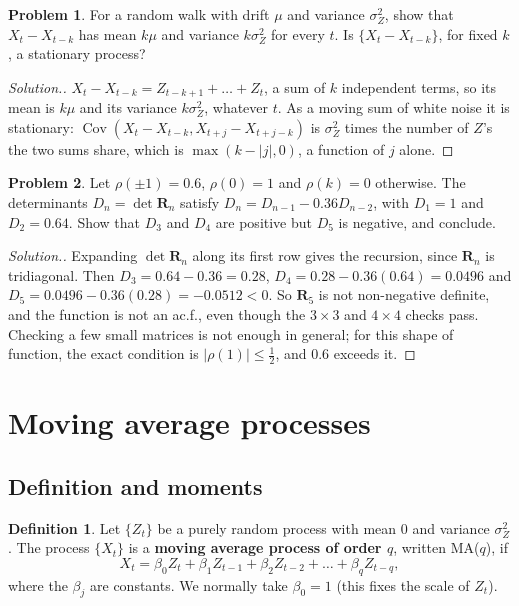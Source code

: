 \documentclass[11pt,a4paper]{article}
\theoremstyle{definition}
\newtheorem{defn}[thm]{Definition}
\newtheorem{problemx}{Problem}[subsection]
\newenvironment{problem}{\begin{problemx}}{\end{problemx}}
\newenvironment{solution}
  {\renewcommand{\qedsymbol}{}\begin{proof}[\textit{Solution}.]}
  {\end{proof}}
\DeclareMathOperator{\Cov}{Cov}
\begin{document}
\begin{problem}\label{prob:ts-rw-increment}
For a random walk with drift $\mu$ and variance $\sigma_Z^2$, show that $X_t - X_{t-k}$ has mean $k\mu$ and variance $k\sigma_Z^2$ for every $t$. Is $\{X_t - X_{t-k}\}$,
for fixed $k$, a stationary process?
\end{problem}

\begin{solution}
$X_t - X_{t-k} = Z_{t-k+1} + \dots + Z_t$, a sum of $k$ independent terms, so its mean is $k\mu$ and its variance $k\sigma_Z^2$, whatever $t$. As a moving sum
of white noise it is stationary: $\Cov(X_t - X_{t-k}, X_{t+j} - X_{t+j-k})$ is $\sigma_Z^2$ times the number of $Z$'s the two sums share, which is $\max(k - |j|, 0)$,
a function of $j$ alone.
\end{solution}

\begin{problem}\label{prob:ts-not-acf}
Let $\rho(\pm1) = 0.6$, $\rho(0) = 1$ and $\rho(k) = 0$ otherwise. The determinants $D_n = \det\mathbf{R}_n$ satisfy $D_n = D_{n-1} - 0.36D_{n-2}$, with $D_1 = 1$ and
$D_2 = 0.64$. Show that $D_3$ and $D_4$ are positive but $D_5$ is negative, and conclude.
\end{problem}

\begin{solution}
Expanding $\det\mathbf{R}_n$ along its first row gives the recursion, since $\mathbf{R}_n$ is tridiagonal. Then
$D_3 = 0.64 - 0.36 = 0.28$, $D_4 = 0.28 - 0.36(0.64) = 0.0496$ and $D_5 = 0.0496 - 0.36(0.28) = -0.0512 < 0$. So $\mathbf{R}_5$ is not non-negative definite, and the
function is not an ac.f., even though the $3 \times 3$ and $4 \times 4$ checks pass. Checking a few small matrices is not enough in
general; for this shape of function, the exact condition is $|\rho(1)| \le \frac12$, and $0.6$ exceeds it.
\end{solution}

\section{Moving average processes}\label{sec:ma}
\subsection{Definition and moments}
\begin{defn}
Let $\{Z_t\}$ be a purely random process with mean $0$ and variance $\sigma_Z^2$. The process $\{X_t\}$ is a \textbf{moving average
process of order $q$}, written MA($q$), if
\[
X_t = \beta_0Z_t + \beta_1Z_{t-1} + \beta_2Z_{t-2} + \dots + \beta_qZ_{t-q} ,
\]
where the $\beta_j$ are constants. We normally take $\beta_0 = 1$ (this fixes the scale of $Z_t$).
\end{defn}
\end{document}

